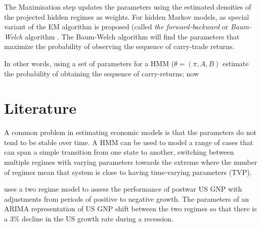 \documentclass[12pt, a4paper, oneside]{article} %
\begin{document}
The Maximisation step updates the parameters using the estimated densities of the projected hidden regimes as weights. For hidden Markov models, as special variant of the EM algorithm is proposed (called \emph{the forward-backward} or \emph{Baum-Welch} algorithm \citet{Baum1970}.   The Baum-Welch algorithm will find the parameters that maximize the probability of observing the sequence of carry-trade returns.  

In other words, using a set of parameters for a HMM ($\theta = (\pi, A, B)$ estimate the probability of obtaining the sequence of carry-returns; now 


\section{Literature}
A common problem in estimating economic models is that the parameters do not tend to be stable over time.  A HMM can be used to model a range of cases that can span a simple transition from one state to another, switching between multiple regimes with varying parameters towards the extreme where the number of regimes mean that system is close to having time-varying parameters (TVP).  

\citet{Hamilton1989} uses a two regime model to assess the performance of postwar US GNP with adjustments from periods of positive to negative growth. The parameters of an ARIMA representation of US GNP shift between the two regimes so that there is a 3\% decline in the US growth rate during a recession.  




\end{document}
